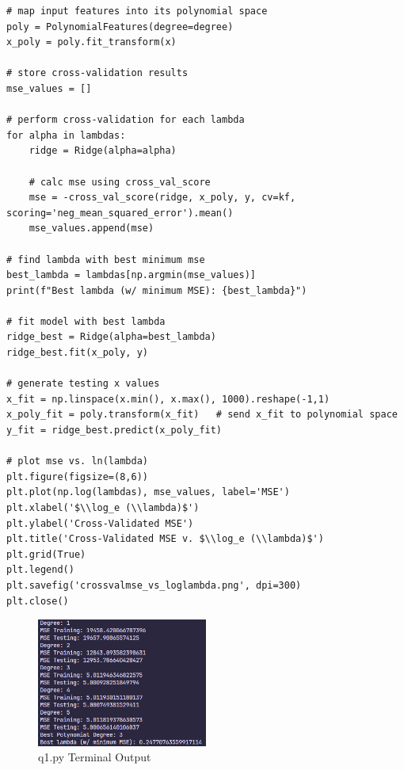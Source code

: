 \documentclass[11pt]{article}
\begin{document}
\begin{lstlisting}
# map input features into its polynomial space
poly = PolynomialFeatures(degree=degree)
x_poly = poly.fit_transform(x)

# store cross-validation results
mse_values = []

# perform cross-validation for each lambda
for alpha in lambdas:
    ridge = Ridge(alpha=alpha)

    # calc mse using cross_val_score
    mse = -cross_val_score(ridge, x_poly, y, cv=kf, scoring='neg_mean_squared_error').mean()
    mse_values.append(mse)

# find lambda with best minimum mse
best_lambda = lambdas[np.argmin(mse_values)]
print(f"Best lambda (w/ minimum MSE): {best_lambda}")

# fit model with best lambda
ridge_best = Ridge(alpha=best_lambda)
ridge_best.fit(x_poly, y)

# generate testing x values
x_fit = np.linspace(x.min(), x.max(), 1000).reshape(-1,1)
x_poly_fit = poly.transform(x_fit)   # send x_fit to polynomial space
y_fit = ridge_best.predict(x_poly_fit)

# plot mse vs. ln(lambda)
plt.figure(figsize=(8,6))
plt.plot(np.log(lambdas), mse_values, label='MSE')
plt.xlabel('$\\log_e (\\lambda)$')
plt.ylabel('Cross-Validated MSE')
plt.title('Cross-Validated MSE v. $\\log_e (\\lambda)$')
plt.grid(True)
plt.legend()
plt.savefig('crossvalmse_vs_loglambda.png', dpi=300)
plt.close()
\end{lstlisting}


\begin{figure}[h!]
  \includegraphics[width=0.5\textwidth]{../outputs/q1.png}
  \centering
  \caption{q1.py Terminal Output}
  \label{fig:q1out}
\end{figure}
\end{document}
